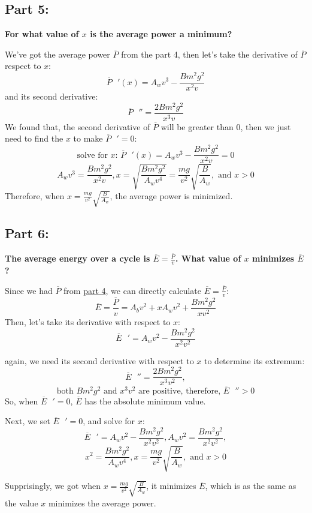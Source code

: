 \documentclass{article}
\begin{document}
\subsection*{Part 5:}
{\large \bfseries For what value of \(x\) is the average power a minimum?
}\setlength{\parskip}{1em}

We've got the average power \(\overline{P}\) from the part 4, then let's take the derivative of \(\overline{P}\) respect to \(x\):
\[\overline{P}\text{ }'(x)= A_wv^3-\frac{Bm^2g^2}{x^2v}\]
and its second derivative:
\[\overline{P}\text{ }'' = \frac{2Bm^2g^2}{x^3v}\]
We found that, the second derivative of \(\overline{P}\) will be greater than \(0\), then we just need to find the \(x\) to make  \(\overline{P}\text{ }' = 0\):
\[\text{solve for }x \text{: }\overline{P}\text{ }'(x)= A_wv^3-\frac{Bm^2g^2}{x^2v} =0 \]
\[A_wv^3 = \frac{Bm^2g^2}{x^2v}, x = \sqrt{\frac{Bm^2g^2}{A_wv^4}} = \frac{mg}{v^2}\sqrt{\frac{B}{A_w}},\text{ and }x > 0\]
Therefore, when \(x = \frac{mg}{v^2}\sqrt{\frac{B}{A_w}}\), the average power is minimized.

\subsection*{Part 6:}
{\large \bfseries The average energy over a cycle is \(\overline{E} = \frac{\overline{P}}{v}\). What value of \(x\) minimizes \(\overline{E}\) ?}

Since we had \(\overline{P}\) from \hyperref[sec:part4]{part 4}, we can directly calculate \(\overline{E} = \frac{\overline{P}}{v}\):
\[\overline{E} = \frac{\overline{P}}{v}=  A_bv^2+xA_wv^2 + \frac{Bm^2g^2}{xv^2} \]
Then, let's take its derivative with respect to \(x\):
\[\overline{E}\text{ }' = A_wv^2-\frac{Bm^2g^2}{x^2v^2}\]

again, we need its second derivative with respect to \(x\) to determine its extremum:
\[\overline{E}\text{ }'' = \frac{2Bm^2g^2}{x^3v^2},\]
\[\text{both }Bm^2g^2 \text{ and } x^3v^2 \text{ are positive, therefore, } \overline{E} \text{ }'' > 0\]
So, when \(\overline{E}\text{ }' = 0\), \(\overline{E}\) has the absolute minimum value.

Next, we set \(\overline{E}\text{ }' = 0\), and solve for \(x\):
\[\overline{E}\text{ }' = A_wv^2-\frac{Bm^2g^2}{x^2v^2}, A_wv^2 = \frac{Bm^2g^2}{x^2v^2},\]
\[x^2=\frac{Bm^2g^2}{A_wv^4}, x = \frac{mg}{v^2}\sqrt{\frac{B}{A_w}},\text{ and }x > 0\]

Supprisingly, we got when \(x = \frac{mg}{v^2}\sqrt{\frac{B}{A_w}}\), it minimizes \(\overline{E}\), which is as the same as the value \(x\) minimizes the average power.
\end{document}
